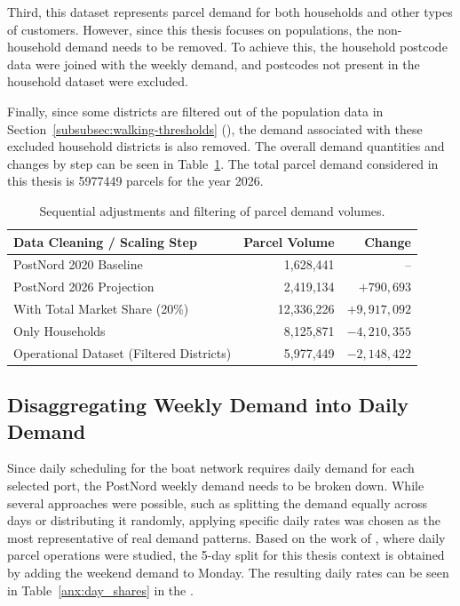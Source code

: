 \documentclass[12pt]{article}
\begin{document}
Third, this dataset represents parcel demand for both households and other types of customers. However, since this thesis focuses on populations, the non-household demand needs to be removed. To achieve this, the household postcode data were joined with the weekly demand, and postcodes not present in the household dataset were excluded.

Finally, since some districts are filtered out of the population data in Section~\ref{subsubsec:walking-thresholds} (), the demand associated with these excluded household districts is also removed. The overall demand quantities and changes by step can be seen in Table~\ref{tab:parcel_volumes}. The total parcel demand considered in this thesis is \num{5977449} parcels for the year 2026.

\begin{table}[htbp]
  \centering
  \caption{Sequential adjustments and filtering of parcel demand volumes.}
  \label{tab:parcel_volumes}
  \begin{tabular}{lrr}
    \toprule
    \textbf{Data Cleaning / Scaling Step}    & \textbf{Parcel Volume} & \textbf{Change} \\
    \midrule
    PostNord 2020 Baseline                   & 1,628,441              & --              \\
    PostNord 2026 Projection                 & 2,419,134              & \(+790,693\)    \\
    With Total Market Share (20\%)           & 12,336,226             & \(+9,917,092\)  \\
    Only Households                          & 8,125,871              & \(-4,210,355\)  \\
    Operational Dataset (Filtered Districts) & 5,977,449              & \(-2,148,422\)  \\
    \bottomrule
  \end{tabular}
\end{table}

\subsection{Disaggregating Weekly Demand into Daily Demand}
\label{subsec:weekly-to-daily-demand}

Since daily scheduling for the boat network requires daily demand for each selected port, the PostNord weekly demand needs to be broken down. While several approaches were possible, such as splitting the demand equally across days or distributing it randomly, applying specific daily rates was chosen as the most representative of real demand patterns. Based on the work of \cite{dailydemand}, where daily parcel operations were studied, the 5-day split for this thesis context is obtained by adding the weekend demand to Monday. The resulting daily rates can be seen in Table~\ref{anx:day_shares} in the .
\end{document}
